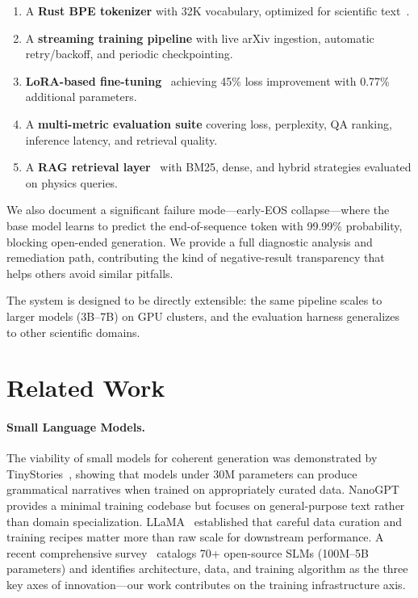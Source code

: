 \documentclass[11pt]{article}
\begin{document}
\begin{enumerate}[leftmargin=*]
    \item A \textbf{Rust BPE tokenizer} with 32K vocabulary, optimized for scientific text~\cite{sennrich2016neural}.
    \item A \textbf{streaming training pipeline} with live arXiv ingestion, automatic retry/backoff, and periodic checkpointing.
    \item \textbf{LoRA-based fine-tuning}~\cite{hu2021lora} achieving 45\% loss improvement with 0.77\% additional parameters.
    \item A \textbf{multi-metric evaluation suite} covering loss, perplexity, QA ranking, inference latency, and retrieval quality.
    \item A \textbf{RAG retrieval layer}~\cite{lewis2020rag} with BM25, dense, and hybrid strategies evaluated on physics queries.
\end{enumerate}

We also document a significant failure mode---early-EOS collapse---where the base model learns to predict the end-of-sequence token with 99.99\% probability, blocking open-ended generation. We provide a full diagnostic analysis and remediation path, contributing the kind of negative-result transparency that helps others avoid similar pitfalls.

The system is designed to be directly extensible: the same pipeline scales to larger models (3B--7B) on GPU clusters, and the evaluation harness generalizes to other scientific domains.

\section{Related Work}
\label{sec:related}

\paragraph{Small Language Models.}
The viability of small models for coherent generation was demonstrated by TinyStories~\cite{eldan2023tinystories}, showing that models under 30M parameters can produce grammatical narratives when trained on appropriately curated data. NanoGPT~\cite{karpathy2023nanogpt} provides a minimal training codebase but focuses on general-purpose text rather than domain specialization. LLaMA~\cite{touvron2023llama} established that careful data curation and training recipes matter more than raw scale for downstream performance. A recent comprehensive survey~\cite{lu2024slmsurvey} catalogs 70+ open-source SLMs (100M--5B parameters) and identifies architecture, data, and training algorithm as the three key axes of innovation---our work contributes on the training infrastructure axis.
\end{document}
